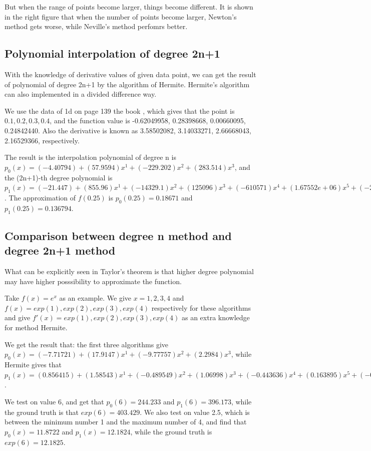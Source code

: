 \documentclass[12pt]{article}
\begin{document}
But when the range of points become larger, things become different. It is shown in the right figure that when the number of points become larger, Newton's method gets worse, while Neville's method perfomrs better.


\subsection{Polynomial interpolation of degree 2n+1}

With the knowledge of derivative values of given data point, we can get the result of polynomial of degree 2n+1 by the algorithm of Hermite. Hermite's algorithm can also implemented in a divided difference way.

We use the data of 1d on page 139 the book \cite{1}, which gives that the point is $0.1, 0.2, 0.3, 0.4$, and the function value is -0.62049958, 0.28398668, 0.00660095, 0.24842440. Also the derivative is known as 3.58502082, 3.14033271, 2.66668043, 2.16529366, respectively.

The result is the interpolation polynomial of degree n is $p_0(x)=(-4.40794)+(57.9594)x^1+(-229.202)x^2+(283.514)x^3$, and the (2n+1)-th degree polynomial is $p_1(x)=(-21.447)+(855.96)x^1+(-14329.1)x^2+(125096)x^3+(-610571)x^4+(1.67552e+06)x^5+(-2.41389e+06)x^6+(1.41993e+06)x^7$. The approximation of $f(0.25)$ is $p_0(0.25)=0.18671$ and $p_1(0.25)=0.136794$.

\subsection{Comparison between degree n method and degree 2n+1 method}

What can be explicitly seen in Taylor's theorem is that higher degree polynomial may have higher posssibility to approximate the function.

Take $f(x)=e^{x}$ as an example. We give $x=1,2,3,4$ and $f(x)=exp(1),exp(2),exp(3),exp(4)$ respectively for these algorithms and give $f'(x)=exp(1),exp(2),exp(3),exp(4)$ as an extra knowledge for method Hermite.

We get the result that: the first three algorithms give $p_0(x)=(-7.71721)+(17.9147)x^1+(-9.77757)x^2+(2.2984)x^3$, while Hermite gives that $p_1(x)=(0.856415)+(1.58543)x^1+(-0.489549)x^2+(1.06998)x^3+(-0.443636)x^4+(0.163895)x^5+(-0.0268424)x^6+(0.00259051)x^7$.

We test on value 6, and get that $p_0(6)=244.233$ and $p_1(6)=396.173$, while the ground truth is that $exp(6)=403.429$. We also test on value 2.5, which is between the minimum number 1 and the maximum number of 4, and find that $p_0(x)=11.8722$ and $p_1(x)=12.1824$, while the ground truth is $exp(6)=12.1825$.
\end{document}
